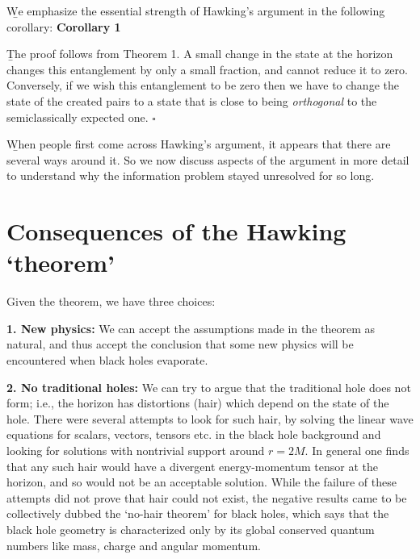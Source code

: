 \documentclass[12pt]{article}
\begin{document}
\b

We emphasize the essential strength of Hawking's argument in the following corollary:
\b

{\bf Corollary 1}

\b

The proof follows from Theorem 1. A small change in the state at the horizon changes this entanglement by only a small fraction, and cannot reduce it to zero. Conversely, if we wish this entanglement to be zero then we have to change the state of the created pairs to a state that is close to being {\it orthogonal} to the semiclassically expected one. \quad $\square$

\b

When people first come across Hawking's argument, it appears that there are several ways around it. So we now discuss aspects of the argument in more detail to understand why the information problem stayed unresolved for so long.

\section{Consequences of the Hawking `theorem'}


Given the theorem, we have three choices:

\b

{\bf 1. New physics:} We can accept the assumptions made in the theorem as natural, and thus accept the conclusion that some new physics will be encountered when black holes evaporate. 

\b

{\bf 2. No traditional holes:}  We can try to argue that the traditional hole does not form; i.e., the horizon has distortions (hair) which depend on the state of the hole. There were several attempts to look for such hair, by solving the linear wave equations for scalars, vectors, tensors etc. in the black hole background and looking for solutions with nontrivial support around $r=2M$. In general one finds that any such hair would have a divergent energy-momentum tensor at the horizon, and so would not be an acceptable solution. While the failure of these attempts did not prove that hair could not exist, the negative results came to be collectively dubbed the `no-hair theorem' for black holes, which says that the black hole geometry is characterized only by its global conserved quantum numbers like mass, charge and angular momentum.
\end{document}
